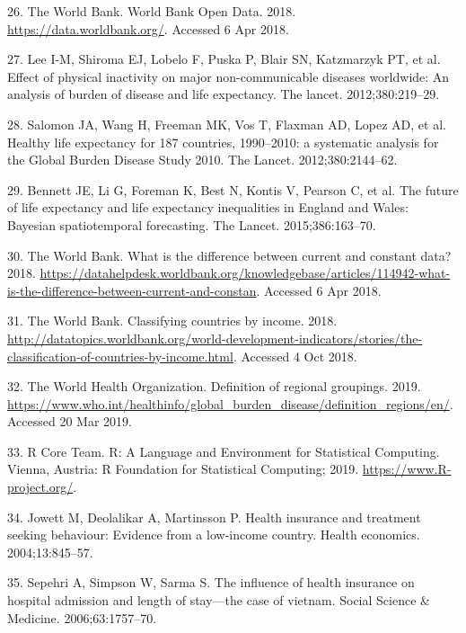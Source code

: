 \documentclass[]{elsarticle} %
\begin{document}
\leavevmode\hypertarget{ref-worldbank}{}%
26. The World Bank. World Bank Open Data. 2018. \url{https://data.worldbank.org/}. Accessed 6 Apr 2018.

\leavevmode\hypertarget{ref-lee2012effect}{}%
27. Lee I-M, Shiroma EJ, Lobelo F, Puska P, Blair SN, Katzmarzyk PT, et al. Effect of physical inactivity on major non-communicable diseases worldwide: An analysis of burden of disease and life expectancy. The lancet. 2012;380:219--29.

\leavevmode\hypertarget{ref-salomon2012healthy}{}%
28. Salomon JA, Wang H, Freeman MK, Vos T, Flaxman AD, Lopez AD, et al. Healthy life expectancy for 187 countries, 1990--2010: a systematic analysis for the Global Burden Disease Study 2010. The Lancet. 2012;380:2144--62.

\leavevmode\hypertarget{ref-bennett2015future}{}%
29. Bennett JE, Li G, Foreman K, Best N, Kontis V, Pearson C, et al. The future of life expectancy and life expectancy inequalities in England and Wales: Bayesian spatiotemporal forecasting. The Lancet. 2015;386:163--70.

\leavevmode\hypertarget{ref-worldbankconstant}{}%
30. The World Bank. What is the difference between current and constant data? 2018. \url{https://datahelpdesk.worldbank.org/knowledgebase/articles/114942-what-is-the-difference-between-current-and-constan}. Accessed 6 Apr 2018.

\leavevmode\hypertarget{ref-worldbankincome}{}%
31. The World Bank. Classifying countries by income. 2018. \url{http://datatopics.worldbank.org/world-development-indicators/stories/the-classification-of-countries-by-income.html}. Accessed 4 Oct 2018.

\leavevmode\hypertarget{ref-WHOregion}{}%
32. The World Health Organization. Definition of regional groupings. 2019. \url{https://www.who.int/healthinfo/global_burden_disease/definition_regions/en/}. Accessed 20 Mar 2019.

\leavevmode\hypertarget{ref-R353}{}%
33. R Core Team. R: A Language and Environment for Statistical Computing. Vienna, Austria: R Foundation for Statistical Computing; 2019. \url{https://www.R-project.org/}.

\leavevmode\hypertarget{ref-jowett2004health}{}%
34. Jowett M, Deolalikar A, Martinsson P. Health insurance and treatment seeking behaviour: Evidence from a low-income country. Health economics. 2004;13:845--57.

\leavevmode\hypertarget{ref-sepehri2006influence}{}%
35. Sepehri A, Simpson W, Sarma S. The influence of health insurance on hospital admission and length of stay---the case of vietnam. Social Science \& Medicine. 2006;63:1757--70.
\end{document}
